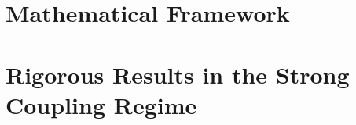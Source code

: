 \documentclass[11pt,a4paper]{article}
\begin{document}
\maketitle

\begin{abstract}

\end{abstract}

\tableofcontents
\newpage


\part{Mathematical Framework}








\part{Rigorous Results in the Strong Coupling Regime}











\end{document}
